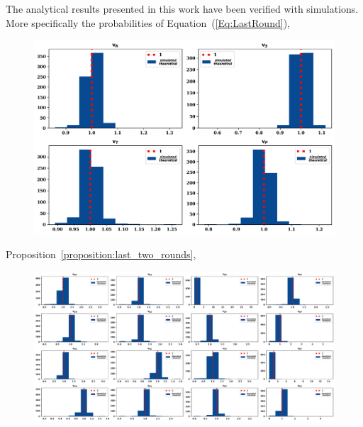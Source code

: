 \documentclass[11pt]{article}
\theoremstyle{plainCl1}
\newtheorem{Prop}{Proposition}
\theoremstyle{plainCl2}
\begin{document}
The analytical results presented in this work have been verified with simulations.
More specifically the probabilities of Equation~(\ref{Eq:LastRound}),

\begin{figure}[!htbp]
  \centering
  \includegraphics[width=.75\textwidth]{static/stationary_four.pdf}
\caption{}
\end{figure}

Proposition~\ref{proposition:last_two_rounds},

\begin{figure}[!htbp]
  \centering
  \includegraphics[width=\textwidth]{static/stationary_sixteen.pdf}
\caption{}
\end{figure}






\end{document}
